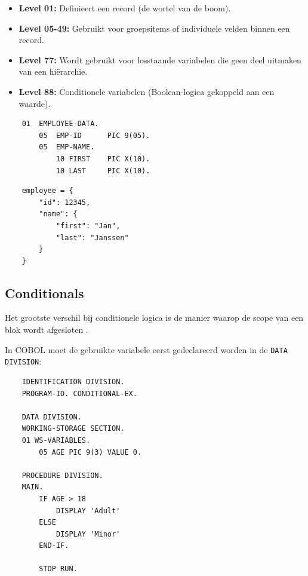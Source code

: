 \begin{itemize}
    \item \textbf{Level 01:} Definieert een record (de wortel van de boom).
    \item \textbf{Level 05-49:} Gebruikt voor groepsitems of individuele velden binnen een record.
    \item \textbf{Level 77:} Wordt gebruikt voor losstaande variabelen die geen deel uitmaken van een hiërarchie.
    \item \textbf{Level 88:} Conditionele variabelen (Boolean-logica gekoppeld aan een waarde).
\end{itemize}

\begin{listing}[H]
  \begin{verbatim}
    01  EMPLOYEE-DATA.
        05  EMP-ID      PIC 9(05).
        05  EMP-NAME.
            10 FIRST    PIC X(10).
            10 LAST     PIC X(10).
  \end{verbatim}
  \caption[Voorbeeld record structuur in COBOL]{Voorbeeld record structuur in COBOL.}
  \label{lst:cobol_record_structuur}
\end{listing}

\begin{listing}[H]
  \begin{verbatim}
    employee = {
        "id": 12345,
        "name": {
            "first": "Jan",
            "last": "Janssen"
        }
    }
  \end{verbatim}
  \caption[Voorbeeld record structuur in Python]{Voorbeeld record structuur in Python.}
  \label{lst:python_record_structuur}
\end{listing}

\subsection{Conditionals}
Het grootste verschil bij conditionele logica is de manier waarop de scope van een blok wordt afgesloten \autocite{IBM2023}.

In COBOL moet de gebruikte variabele eerst gedeclareerd worden in de \texttt{DATA DIVISION}:

\begin{listing}[H]
  \begin{verbatim}
    IDENTIFICATION DIVISION.
    PROGRAM-ID. CONDITIONAL-EX.

    DATA DIVISION.
    WORKING-STORAGE SECTION.
    01 WS-VARIABLES.
        05 AGE PIC 9(3) VALUE 0.

    PROCEDURE DIVISION.
    MAIN.
        IF AGE > 18
            DISPLAY 'Adult'
        ELSE
            DISPLAY 'Minor'
        END-IF.

        STOP RUN.
  \end{verbatim}
  \caption[Conditional in COBOL]{Conditional in COBOL.}
  \label{lst:cobol_conditional}
\end{listing}

